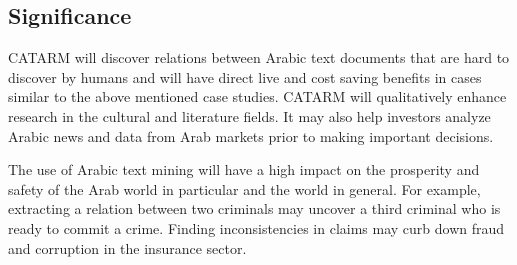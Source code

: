 \documentclass[12pt]{article}
\begin{document}
{%
 
\subsection{Significance} 

CATARM will discover relations between Arabic text documents that 
are hard to discover by humans and will have direct live and
cost saving benefits in cases similar to the above mentioned 
case studies. 
CATARM will qualitatively enhance research in the cultural and 
literature fields. 
It may also help investors analyze Arabic news and data from Arab 
markets prior to making important decisions.

The use of Arabic text mining  will 
have a high impact on the prosperity and safety of the Arab world 
in particular and the world in general.
For example, extracting a relation between two criminals may 
uncover a third criminal who is ready to commit a crime.
Finding inconsistencies in claims may curb down fraud and corruption 
in the insurance sector.

}
\end{document}
